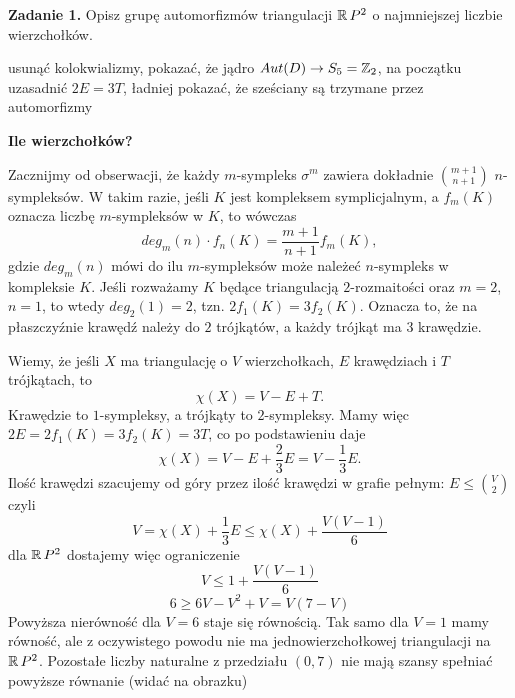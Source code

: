 \textbf{\large\color{orange}Zadanie 1.} Opisz grupę automorfizmów triangulacji $\operatorname{\mathbb{R}} P^2$ o najmniejszej liczbie wierzchołków.

{\large\color{red}usunąć kolokwializmy, pokazać, że jądro $Aut(D)\to S_5=\operatorname{\mathbb{Z}}_2$, na początku uzasadnić $2E=3T$, ładniej pokazać, że sześciany są trzymane przez automorfizmy}

\textbf{Ile wierzchołków?}

Zacznijmy od obserwacji, że każdy $m$-sympleks $\sigma^m$ zawiera dokładnie $\binom{m+1}{n+1}$ $n$-sympleksów. W takim razie, jeśli $K$ jest kompleksem symplicjalnym, a $f_m(K)$ oznacza liczbę $m$-sympleksów w $K$, to wówczas
$$deg_m(n)\cdot f_n(K)=\frac{m+1}{n+1}f_m(K),$$
gdzie $deg_m(n)$ mówi do ilu $m$-sympleksów może należeć $n$-sympleks w kompleksie $K$. Jeśli rozważamy $K$ będące triangulacją $2$-rozmaitości oraz $m=2$, $n=1$, to wtedy $deg_2(1)=2$, tzn. $2 f_1(K)=3f_2(K)$. Oznacza to, że na płaszczyźnie krawędź należy do $2$ trójkątów, a każdy trójkąt ma $3$ krawędzie.

Wiemy, że jeśli $X$ ma triangulację o $V$ wierzchołkach, $E$ krawędziach i $T$ trójkątach, to 
$$\chi(X)=V-E+T.$$
Krawędzie to $1$-sympleksy, a trójkąty to $2$-sympleksy. Mamy więc $2E=2f_1(K)=3f_2(K)=3T$, co po podstawieniu daje
$$\chi(X)=V-E+\frac{2}{3}E=V-\frac{1}{3}E.$$
Ilość krawędzi szacujemy od góry przez ilość krawędzi w grafie pełnym: $E\leq \binom{V}{2}$ czyli
$$V=\chi(X)+\frac{1}{3}E\leq \chi(X)+\frac{V(V-1)}{6}$$
dla $\operatorname{\mathbb{R}} P^2$ dostajemy więc ograniczenie
$$V\leq 1+\frac{V(V-1)}{6}$$
$$6\geq 6V-V^2+V=V(7-V)$$
Powyższa nierówność dla $V=6$ staje się równością. Tak samo dla $V=1$ mamy równość, ale z oczywistego powodu nie ma jednowierzchołkowej triangulacji na $\operatorname{\mathbb{R}} P^2$. Pozostałe liczby naturalne z przedziału $(0, 7)$ nie mają szansy spełniać powyższe równanie (widać na obrazku)
\begin{center}
\end{center}

